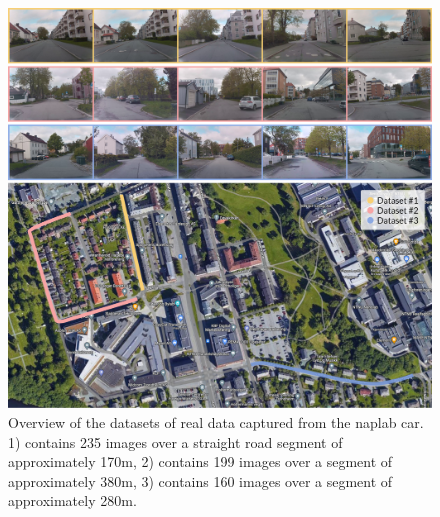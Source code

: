 \begin{figure}[h]
    \centering
    \includegraphics[width=1.0\textwidth]{figures/naplab-dataset.png}
    \caption[The datasets captured from the NAPLab car.]{Overview of the datasets of real data captured from the \acrshort{naplab} car. 1) contains 235 images over a straight road segment of approximately 170m, 2) contains 199 images over a segment of approximately 380m, 3) contains 160 images over a segment of approximately 280m.}
    \label{fig:naplab-dataset}
\end{figure}